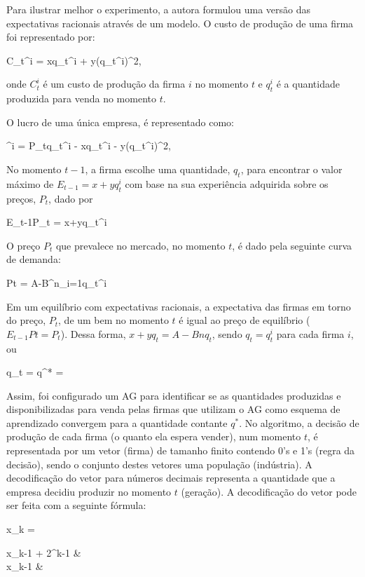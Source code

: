 Para ilustrar melhor o experimento, a autora formulou uma versão das expectativas racionais através de um modelo. O custo de produção de uma firma foi representado por:

\equacao
	{C_{t}^i = xq_{t}^i + y(q_{t}^i)^2,}
	{}

\noindent onde $C_{t}^i$ é um custo de produção da firma $i$ no momento $t$ e $q_{t}^i$ é a quantidade produzida para venda no momento $t$.

O lucro de uma única empresa, é representado como:

\equacao
	{^i = P_{t}q_{t}^i - xq_{t}^i - y(q_{t}^i)^2,}
	{}

No momento $t-1$, a firma escolhe uma quantidade, $q_{t}$, para encontrar o valor máximo de $E_{t-1}=x+yq_{t}^i$ com base na sua experiência adquirida sobre os preços, $P_t$, dado por

\equacao
	{E_{t-1}P_t = x+yq_{t}^i}
	{}

O preço $P_t$ que prevalece no mercado, no momento $t$, é dado pela seguinte curva de demanda:

\equacao
	{P{t} = A-B\sum^{n}_{i=1}{q_{t}^i}}
	{}
	
Em um equilíbrio com expectativas racionais, a expectativa das firmas em torno do preço, $P_t$, de um bem no momento $t$ é igual ao preço de equilíbrio ($E_{t-1}Pt = P_{t}$). Dessa forma, $x + yq_t = A - Bnq_{t}$, sendo $q_t = q_{t}^i$ para cada firma $i$, ou

\equacao
	{q_t = q^* = }
	{}

Assim, foi configurado um AG para identificar se as quantidades produzidas e disponibilizadas para venda pelas firmas que utilizam o AG como esquema de aprendizado convergem para a quantidade contante $q^*$. No algoritmo, a decisão de produção de cada firma (o quanto ela espera vender), num momento $t$, é representada por um vetor (firma) de tamanho finito contendo 0's e 1's (regra da decisão), sendo o conjunto destes vetores uma população (indústria). A decodificação do vetor para números decimais representa a quantidade que a empresa decidiu produzir no momento $t$ (geração). A decodificação do vetor pode ser feita com a seguinte fórmula:

\equacao
	{%
		x_{k} = {
			\begin{cases}
				x_{k-1} + 2^{k-1} &  \\
				x_{k-1} 		  & 
			\end{cases}
		}
	}
	{}



